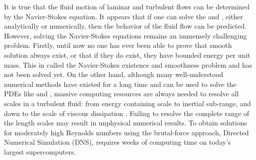 It is true that the fluid motion of laminar and turbulent flows can be determined by the Navier-Stokes equation. It appears that if one can solve the  and , either analytically or numerically, then the behavior of the fluid flow can be predicted. However, solving the Navier-Stokes equations remains an immensely challenging problem. Firstly, until now no one has ever been able to prove that smooth solution always exist, or that if they do exist, they have bounded energy per unit mass. This in called the Navier-Stokes existence and smoothness problem and has not been solved yet. On the other hand, although many well-understood numerical methods have existed for a long time and can be used to solve the PDEs like  and , massive computing resources are always needed to resolve all scales in a turbulent fluid: from energy containing scale to inertial sub-range, and down to the scale of viscous dissipation \cite{PopeTurbulent2000}. Failing to resolve the complete range of the length scales may result in unphysical numerical results. To obtain solutions for moderately high Reynolds numbers using the brutal-force approach, Directed Numerical Simulation (DNS), requires weeks of computing time on today's largest supercomputers. 

